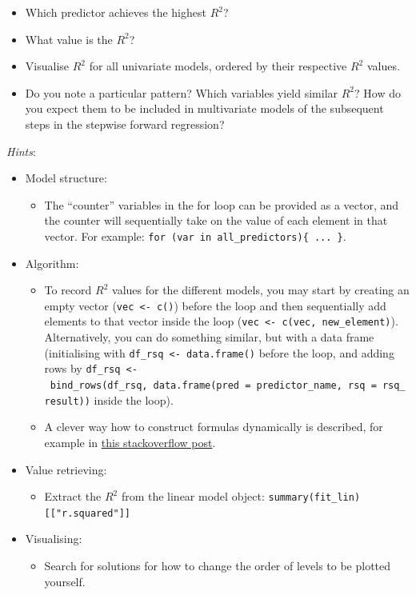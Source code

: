 \documentclass[
]{book}
\providecommand{\tightlist}{%
  \setlength{\itemsep}{0pt}\setlength{\parskip}{0pt}}
\begin{document}
\begin{itemize}
\tightlist
\item
  Which predictor achieves the highest \(R^2\)?
\item
  What value is the \(R^2\)?
\item
  Visualise \(R^2\) for all univariate models, ordered by their respective \(R^2\) values.
\item
  Do you note a particular pattern? Which variables yield similar \(R^2\)? How do you expect them to be included in multivariate models of the subsequent steps in the stepwise forward regression?
\end{itemize}

\emph{Hints}:

\begin{itemize}
\item
  Model structure:

  \begin{itemize}
  \tightlist
  \item
    The ``counter'' variables in the for loop can be provided as a vector, and the counter will sequentially take on the value of each element in that vector. For example: \texttt{for\ (var\ in\ all\_predictors)\{\ ...\ \}}.
  \end{itemize}
\item
  Algorithm:

  \begin{itemize}
  \item
    To record \(R^2\) values for the different models, you may start by creating an empty vector (\texttt{vec\ \textless{}-\ c()}) before the loop and then sequentially add elements to that vector inside the loop (\texttt{vec\ \textless{}-\ c(vec,\ new\_element)}). Alternatively, you can do something similar, but with a data frame (initialising with \texttt{df\_rsq\ \textless{}-\ data.frame()} before the loop, and adding rows by \texttt{df\_rsq\ \textless{}-\ bind\_rows(df\_rsq,\ data.frame(pred\ =\ predictor\_name,\ rsq\ =\ rsq\_result))} inside the loop).
  \item
    A clever way how to construct formulas dynamically is described, for example in \href{https://stackoverflow.com/questions/4951442/formula-with-dynamic-number-of-variables}{this stackoverflow post}.
  \end{itemize}
\item
  Value retrieving:

  \begin{itemize}
  \tightlist
  \item
    Extract the \(R^2\) from the linear model object: \texttt{summary(fit\_lin){[}{[}"r.squared"{]}{]}}
  \end{itemize}
\item
  Visualising:

  \begin{itemize}
  \tightlist
  \item
    Search for solutions for how to change the order of levels to be plotted yourself.
  \end{itemize}
\end{itemize}
\end{document}
